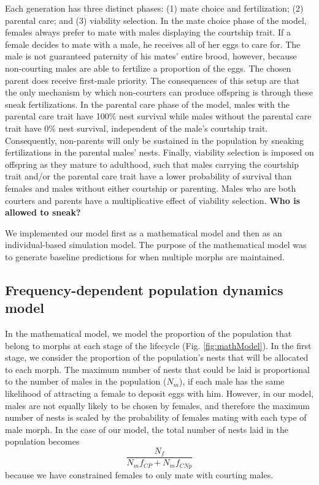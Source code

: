 \documentclass[
  11pt,
]{article}
\begin{document}
Each generation has three distinct phases: (1) mate choice and
fertilization; (2) parental care; and (3) viability selection. In the
mate choice phase of the model, females always prefer to mate with males
displaying the courtship trait. If a female decides to mate with a male,
he receives all of her eggs to care for. The male is not guaranteed
paternity of his mates' entire brood, however, because non-courting
males are able to fertilize a proportion of the eggs. The chosen parent
does receive first-male priority. The consequences of this setup are
that the only mechanism by which non-courters can produce offspring is
through these sneak fertilizations. In the parental care phase of the
model, males with the parental care trait have 100\% nest survival while
males without the parental care trait have 0\% nest survival, independent
of the male's courtship trait. Consequently, non-parents will only be
sustained in the population by sneaking fertilizations in the parental
males' nests. Finally, viability selection is imposed on offspring as
they mature to adulthood, such that males carrying the courtship trait
and/or the parental care trait have a lower probability of survival than
females and males without either courtship or parenting. Males who are
both courters and parents have a multiplicative effect of viability
selection. \textbf{Who is allowed to sneak?}

We implemented our model first as a mathematical model and then as an
individual-based simulation model. The purpose of the mathematical model
was to generate baseline predictions for when multiple morphs are
maintained.

\hypertarget{frequency-dependent-population-dynamics-model}{%
\subsection{Frequency-dependent population dynamics model}\label{frequency-dependent-population-dynamics-model}}

In the mathematical model, we model the proportion of the population
that belong to morphs at each stage of the lifecycle (Fig.
\ref{fig:mathModel}). In the first stage, we consider the proportion of
the population's nests that will be allocated to each morph. The maximum
number of nests that could be laid is proportional to the number of
males in the population (\(N_m\)), if each male has the same likelihood of
attracting a female to deposit eggs with him. However, in our model,
males are not equally likely to be chosen by females, and therefore the
maximum number of nests is scaled by the probability of females mating
with each type of male morph. In the case of our model, the total number
of nests laid in the population becomes \[
\frac{N_f}{N_mf_{CP}+N_m f_{CNp}}
\] because we have constrained females to only mate with courting males.
\end{document}
